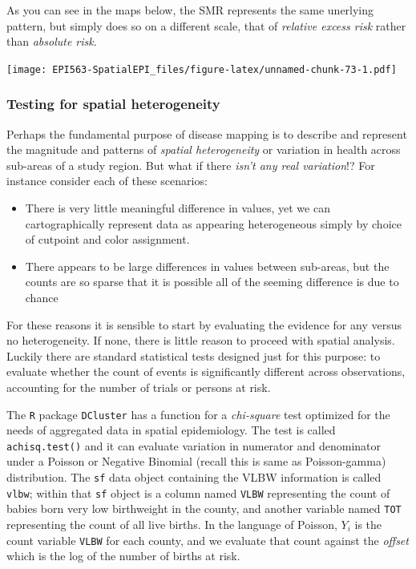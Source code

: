 \documentclass[
]{book}
\newcommand{\passthrough}[1]{#1}
\providecommand{\tightlist}{%
  \setlength{\itemsep}{0pt}\setlength{\parskip}{0pt}}
\begin{document}
As you can see in the maps below, the SMR represents the same unerlying pattern, but simply does so on a different scale, that of \emph{relative excess risk} rather than \emph{absolute risk}.

\texttt{[image: EPI563-SpatialEPI\_files/figure-latex/unnamed-chunk-73-1.pdf]}

\hypertarget{testing-for-spatial-heterogeneity}{%
\subsubsection{Testing for spatial heterogeneity}\label{testing-for-spatial-heterogeneity}}

Perhaps the fundamental purpose of disease mapping is to describe and represent the magnitude and patterns of \emph{spatial heterogeneity} or variation in health across sub-areas of a study region. But what if there \emph{isn't any real variation}!? For instance consider each of these scenarios:

\begin{itemize}
\tightlist
\item
  There is very little meaningful difference in values, yet we can cartographically represent data as appearing heterogeneous simply by choice of cutpoint and color assignment.
\item
  There appears to be large differences in values between sub-areas, but the counts are so sparse that it is possible all of the seeming difference is due to chance
\end{itemize}

For these reasons it is sensible to start by evaluating the evidence for any versus no heterogeneity. If none, there is little reason to proceed with spatial analysis. Luckily there are standard statistical tests designed just for this purpose: to evaluate whether the count of events is significantly different across observations, accounting for the number of trials or persons at risk.

The \passthrough{\lstinline!R!} package \passthrough{\lstinline!DCluster!} has a function for a \emph{chi-square} test optimized for the needs of aggregated data in spatial epidemiology. The test is called \passthrough{\lstinline!achisq.test()!} and it can evaluate variation in numerator and denominator under a Poisson or Negative Binomial (recall this is same as Poisson-gamma) distribution. The \passthrough{\lstinline!sf!} data object containing the VLBW information is called \passthrough{\lstinline!vlbw!}; within that \passthrough{\lstinline!sf!} object is a column named \passthrough{\lstinline!VLBW!} representing the count of babies born very low birthweight in the county, and another variable named \passthrough{\lstinline!TOT!} representing the count of all live births. In the language of Poisson, \(Y_i\) is the count variable \passthrough{\lstinline!VLBW!} for each county, and we evaluate that count against the \emph{offset} which is the log of the number of births at risk.
\end{document}
